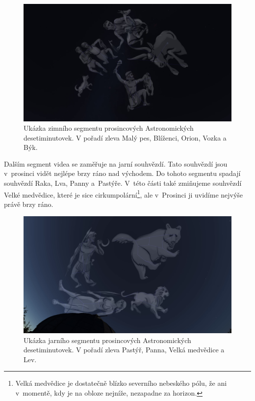 \documentclass[12pt,a4paper,titlepage]{article}
\begin{document}
\begin{figure}[H]
	\centering
	\includegraphics[width=.95\textwidth]{ac12_zima.png}
	\caption{Ukázka zimního segmentu prosincových Astronomických desetiminutovek. V pořadí zleva Malý pes, Blíženci, Orion, Vozka a Býk.}\label{prac:ac12_zima}
\end{figure}

Dalším segment videa se zaměřuje na jarní souhvězdí. Tato souhvězdí jsou v~prosinci vidět nejlépe brzy ráno nad východem. Do tohoto segmentu spadají souhvězdí Raka, Lva, Panny a~Pastýře. V~této části také zmiňujeme souhvězdí Velké medvědice, které je sice cirkumpolární\footnote{Velká medvědice je dostatečně blízko severního nebeského pólu, že ani v~momentě, kdy je na obloze nejníže, nezapadne za horizon.}, ale v~Prosinci ji uvidíme nejvýše právě brzy ráno.

\begin{figure}[H]
	\centering
	\includegraphics[width=.95\textwidth]{ac12_jaro.png}
	\caption{Ukázka jarního segmentu prosincových Astronomických desetiminutovek. V pořadí zleva Pastýř, Panna, Velká medvědice a Lev.}\label{prac:ac12_jaro}
\end{figure}
\end{document}
